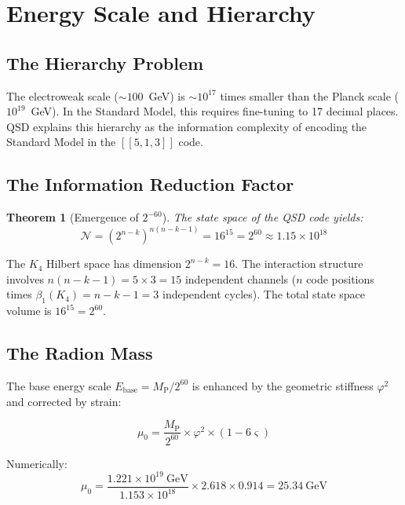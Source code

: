 \documentclass[11pt,a4paper]{article}
\newtheorem{theorem}{Theorem}[section]
\theoremstyle{definition}
\newcommand{\strain}{\varsigma}
\newcommand{\Mpl}{M_{\mathrm{P}}}
\newcommand{\murad}{\mu_0}
\begin{document}
\section{Energy Scale and Hierarchy}
\label{sec:hierarchy}

\subsection{The Hierarchy Problem}

The electroweak scale ($\sim 100$~GeV) is $\sim 10^{17}$ times smaller than the Planck scale ($10^{19}$~GeV). In the Standard Model, this requires fine-tuning to 17 decimal places. QSD explains this hierarchy as the information complexity of encoding the Standard Model in the $[[5,1,3]]$ code.

\subsection{The Information Reduction Factor}

\begin{theorem}[Emergence of $2^{-60}$]
\label{thm:hierarchy_factor}
The state space of the QSD code yields:
\begin{equation}
\mathcal{N} = \left(2^{n-k}\right)^{n(n-k-1)} = 16^{15} = 2^{60} \approx 1.15 \times 10^{18}
\label{eq:reduction}
\end{equation}
\end{theorem}

The $K_4$ Hilbert space has dimension $2^{n-k} = 16$. The interaction structure involves $n(n-k-1) = 5 \times 3 = 15$ independent channels ($n$ code positions times $\beta_1(K_4) = n - k - 1 = 3$ independent cycles). The total state space volume is $16^{15} = 2^{60}$.

\subsection{The Radion Mass}

The base energy scale $E_{\text{base}} = \Mpl / 2^{60}$ is enhanced by the geometric stiffness $\varphi^2$ and corrected by strain:

\begin{equation}
\boxed{\murad = \frac{\Mpl}{2^{60}} \times \varphi^2 \times (1 - 6\strain)}
\label{eq:radion}
\end{equation}

Numerically:
\begin{equation}
\murad = \frac{1.221 \times 10^{19}~\text{GeV}}{1.153 \times 10^{18}} \times 2.618 \times 0.914 = 25.34~\text{GeV}
\end{equation}
\end{document}
